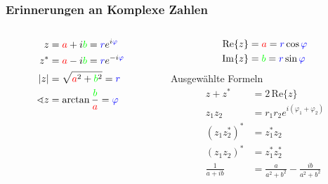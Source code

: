 \documentclass[hyperref={pdfpagemode=FullScreen, colorlinks=false}]{beamer}
\begin{document}
\begin{frame}
\frametitle{Erinnerungen an Komplexe Zahlen}
\begin{columns}
        \begin{column}[t]{.3\linewidth}

         \begin{align*}
          z&={\color{red}a}+i{\color{green}b}={\color{blue}r}e^{i{\color{blue}\varphi}}\\
          z^*&={\color{red}a}-i{\color{green}b}={\color{blue}r}e^{-i{\color{blue}\varphi}}\\
          |z|&=\sqrt{{\color{red}a}^2+{\color{green}b}^2}={\color{blue}r}\\
          \sphericalangle z &=\arctan\frac{\color{green}b}{\color{red}a}={\color{blue}\varphi}
         \end{align*}
        \end{column}
        \begin{column}[t]{.7\linewidth}
        \vspace{-3cm}
        \begin{align*}
         \mathrm{Re}\{z\}&={\color{red}a}  ={\color{blue}r}\cos{\color{blue}\varphi}\\
         \mathrm{Im}\{z\}&={\color{green}b}={\color{blue}r}\sin{\color{blue}\varphi}
        \end{align*}
        \hspace{2cm} Ausgewählte Formeln
         \begin{align*}
          z+z^*&=2\,\mathrm{Re}\{z\}\\
          z_1z_2&=r_1r_2 e^{i(\varphi_1+\varphi_2)}\\
          (z_1z_2^*)^*&=z_1^*z_2\\
          (z_1 z_2)^*&=z_1^*z_2^*\\
          \frac{1}{a+ib}&=\frac{a}{a^2+b^2}-\frac{ib}{a^2+b^2}
         \end{align*}
        \end{column}
\end{columns}
\end{frame}
\end{document}
